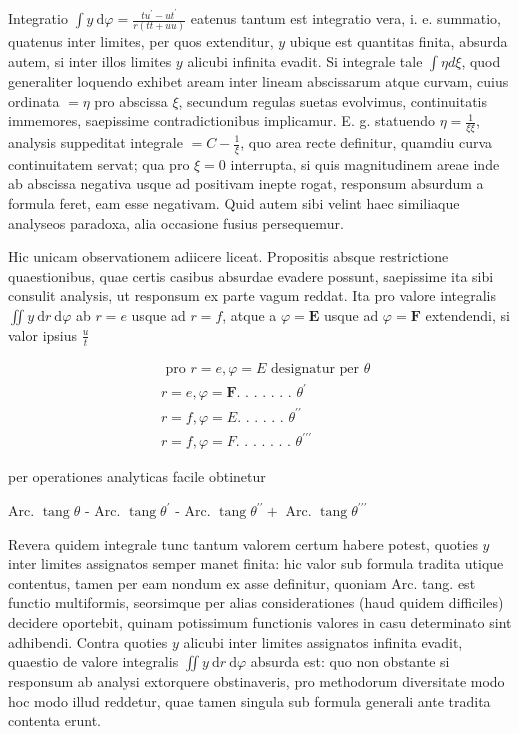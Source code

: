 \documentclass[10pt]{article}
\begin{document}
Integratio \(\int y \mathrm{~d} \varphi=\frac{t u^{\prime}-u t^{\prime}}{r(t t+u u)}\) eatenus tantum est integratio vera, i. e. summatio, quatenus inter limites, per quos extenditur, \(y\) ubique est quantitas finita, absurda autem, si inter illos limites \(y\) alicubi infinita evadit. Si integrale tale \(\int \eta d \xi\), quod generaliter loquendo exhibet aream inter lineam abscissarum atque curvam, cuius ordinata \(=\eta\) pro abscissa \(\xi\), secundum regulas suetas evolvimus, continuitatis immemores, saepissime contradictionibus implicamur. E. g. statuendo \(\eta=\frac{1}{\xi \xi}\), analysis suppeditat integrale \(=C-\frac{1}{\xi}\), quo area recte definitur, quamdiu curva continuitatem servat; qua pro \(\xi=0\) interrupta, si quis magnitudinem areae inde ab abscissa negativa usque ad positivam inepte rogat, responsum absurdum a formula feret, eam esse negativam. Quid autem sibi velint haec similiaque analyseos paradoxa, alia occasione fusius persequemur.

Hic unicam observationem adiicere liceat. Propositis absque restrictione quaestionibus, quae certis casibus absurdae evadere possunt, saepissime ita sibi consulit analysis, ut responsum ex parte vagum reddat. Ita pro valore integralis \(\iint y \mathrm{~d} r \mathrm{~d} \varphi\) ab \(r=e\) usque ad \(r=f\), atque a \(\varphi=\boldsymbol{E}\) usque ad \(\varphi=\boldsymbol{F}\) extendendi, si valor ipsius \(\frac{u}{t}\)

\[
\begin{aligned}
& \text { pro } r=e, \varphi=E \text { designatur per } \theta \\
& r=e, \varphi=\boldsymbol{F} \text {. . . . . . . } \theta^{\prime} \\
& r=f, \varphi=E \text {. . . . . . } \theta^{\prime \prime} \\
& r=f, \varphi=F \text {. . . . . . . } \theta^{\prime \prime \prime}
\end{aligned}
\]

per operationes analyticas facile obtinetur

Arc. \(\operatorname{tang} \theta\) - Arc. \(\operatorname{tang} \theta^{\prime}\) - Arc. \(\operatorname{tang} \theta^{\prime \prime}+\) Arc. \(\operatorname{tang} \theta^{\prime \prime \prime}\)

Revera quidem integrale tunc tantum valorem certum habere potest, quoties \(y\) inter limites assignatos semper manet finita: hic valor sub formula tradita utique contentus, tamen per eam nondum ex asse definitur, quoniam Arc. tang. est functio multiformis, seorsimque per alias considerationes (haud quidem difficiles) decidere oportebit, quinam potissimum functionis valores in casu determinato sint adhibendi. Contra quoties \(y\) alicubi inter limites assignatos infinita evadit, quaestio de valore integralis \(\iint y \mathrm{~d} r \mathrm{~d} \varphi\) absurda est: quo non obstante si responsum ab analysi extorquere obstinaveris, pro methodorum diversitate modo hoc modo illud reddetur, quae tamen singula sub formula generali ante tradita contenta erunt.
\end{document}
